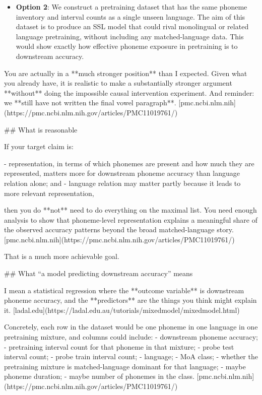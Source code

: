 \begin{itemize}
    \item \textbf{Option 2}: We construct a pretraining dataset that has the same phoneme inventory and interval counts as a single unseen language. The aim of this dataset is to produce an SSL model that could rival monolingual or related language pretraining, without including any matched-language data. This would show exactly how effective phoneme exposure in pretraining is to downstream accuracy.
\end{itemize}

\iffalse
You are actually in a **much stronger position** than I expected. Given what you already have, it is realistic to make a substantially stronger argument **without** doing the impossible causal intervention experiment. And reminder: we **still have not written the final vowel paragraph**. [pmc.ncbi.nlm.nih](https://pmc.ncbi.nlm.nih.gov/articles/PMC11019761/)

## What is reasonable

If your target claim is:

- representation, in terms of which phonemes are present and how much they are represented, matters more for downstream phoneme accuracy than language relation alone; and
- language relation may matter partly because it leads to more relevant representation,

then you do **not** need to do everything on the maximal list. You need enough analysis to show that phoneme-level representation explains a meaningful share of the observed accuracy patterns beyond the broad matched-language story. [pmc.ncbi.nlm.nih](https://pmc.ncbi.nlm.nih.gov/articles/PMC11019761/)

That is a much more achievable goal.

## What “a model predicting downstream accuracy” means

I mean a statistical regression where the **outcome variable** is downstream phoneme accuracy, and the **predictors** are the things you think might explain it. [ladal.edu](https://ladal.edu.au/tutorials/mixedmodel/mixedmodel.html)

Concretely, each row in the dataset would be one phoneme in one language in one pretraining mixture, and columns could include:
- downstream phoneme accuracy;
- pretraining interval count for that phoneme in that mixture;
- probe test interval count;
- probe train interval count;
- language;
- MoA class;
- whether the pretraining mixture is matched-language dominant for that language;
- maybe phoneme duration;
- maybe number of phonemes in the class. [pmc.ncbi.nlm.nih](https://pmc.ncbi.nlm.nih.gov/articles/PMC11019761/)


